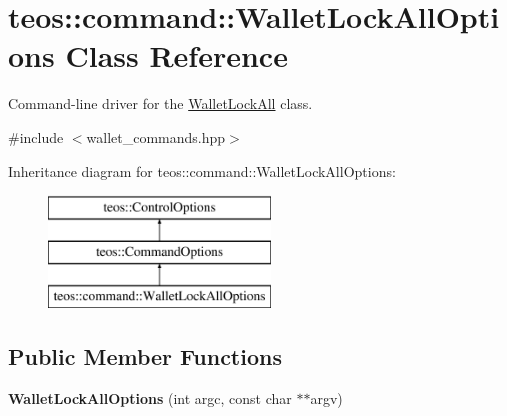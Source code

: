 \hypertarget{classteos_1_1command_1_1_wallet_lock_all_options}{}\section{teos\+:\+:command\+:\+:Wallet\+Lock\+All\+Options Class Reference}
\label{classteos_1_1command_1_1_wallet_lock_all_options}


Command-\/line driver for the \mbox{\hyperlink{classteos_1_1command_1_1_wallet_lock_all}{Wallet\+Lock\+All}} class.  




{\ttfamily \#include $<$wallet\+\_\+commands.\+hpp$>$}

Inheritance diagram for teos\+:\+:command\+:\+:Wallet\+Lock\+All\+Options\+:\begin{figure}[H]
\begin{center}
\leavevmode
\includegraphics[height=3.000000cm]{classteos_1_1command_1_1_wallet_lock_all_options}
\end{center}
\end{figure}
\subsection*{Public Member Functions}
\begin{DoxyCompactItemize}
\item 
\mbox{\label{classteos_1_1command_1_1_wallet_lock_all_options_ac2aa30d7cdd0d8a0813e72b1773074b6}} 
{\bfseries Wallet\+Lock\+All\+Options} (int argc, const char $\ast$$\ast$argv)
\end{DoxyCompactItemize}
